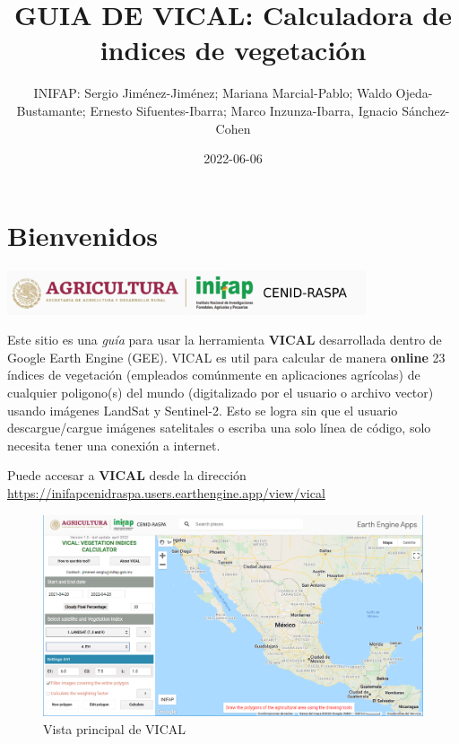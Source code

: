 \documentclass[
]{book}
\title{GUIA DE VICAL: Calculadora de indices de vegetación}
\author{INIFAP: Sergio Jiménez-Jiménez; Mariana Marcial-Pablo; Waldo Ojeda-Bustamante; Ernesto Sifuentes-Ibarra; Marco Inzunza-Ibarra, Ignacio Sánchez-Cohen}
\date{2022-06-06}
\begin{document}
\maketitle

{
\setcounter{tocdepth}{1}
\tableofcontents
}
\hypertarget{bienvenidos}{%
\chapter*{Bienvenidos}\label{bienvenidos}}

\begin{center}\includegraphics{./images/LogoVICAL} \end{center}

Este sitio es una \emph{guía} para usar la herramienta \textbf{VICAL} desarrollada dentro de Google Earth Engine (GEE). VICAL es util para calcular de manera \textbf{online} 23 índices de vegetación (empleados comúnmente en aplicaciones agrícolas) de cualquier poligono(s) del mundo (digitalizado por el usuario o archivo vector) usando imágenes LandSat y Sentinel-2. Esto se logra sin que el usuario descargue/cargue imágenes satelitales o escriba una solo línea de código, solo necesita tener una conexión a internet.

Puede accesar a \textbf{VICAL} desde la dirección
\url{https://inifapcenidraspa.users.earthengine.app/view/vical}

\begin{figure}

{\centering \includegraphics[width=0.9\linewidth]{./images/Figure4} 

}

\caption{Vista principal de VICAL}\label{fig:fig2}
\end{figure}
\end{document}
